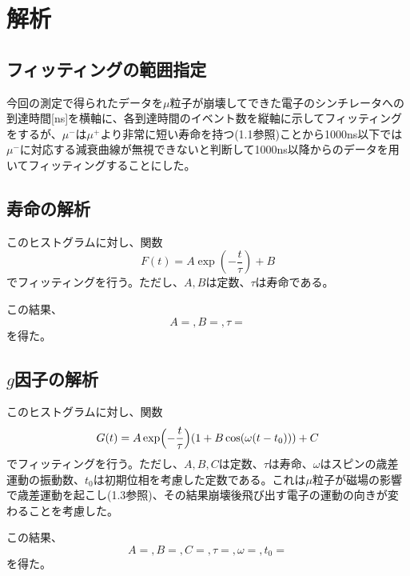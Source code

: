 \section{解析}
\subsection{フィッティングの範囲指定}
今回の測定で得られたデータを$\mu$粒子が崩壊してできた電子のシンチレータへの到達時間[ns]を‎横軸に、各到達時間のイベント数を縦軸に示してフィッティングをするが、$\mu^-$は$\mu^+$より非常に短い寿命を持つ(1.1参照)ことから1000ns以下では$\mu^-$に対応する減衰曲線が無視できないと判断して1000ns以降からのデータを用いてフィッティングすることにした。

\subsection{寿命の解析}

このヒストグラムに対し、関数
\begin{equation}
F(t)=A\exp(-\frac{t}{\tau})+B
\end{equation}
でフィッティングを行う。ただし、$A,B$は定数、$\tau$は寿命である。

この結果、
\begin{equation}
A= ,B= ,\tau=
\end{equation}
を得た。

\subsection{$g$因子の解析}

このヒストグラムに対し、関数
\begin{equation}
G(t)=A\exp\Bigl(-\frac{t}{\tau}\Bigr)(1+B\cos(\omega(t-t_0)))+C
\end{equation}
でフィッティングを行う。ただし、$A,B,C$は定数、$\tau$は寿命、$\omega$はスピンの歳差運動の振動数、$t_0$は初期位相を考慮した定数である。これは$\mu$粒子が磁場の影響で歳差運動を起こし(1.3参照)、その結果崩壊後飛び出す電子の運動の向きが変わることを考慮した。


この結果、
\begin{equation}
A= ,B= ,C= ,\tau= ,\omega= ,t_0=
\end{equation}
を得た。

